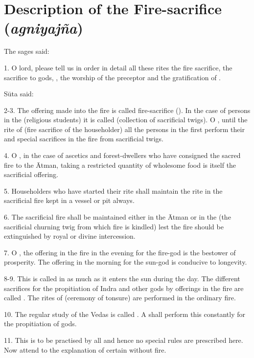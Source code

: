\chapter{Description of the Fire-sacrifice (\emph{agniyajña})}

The sages said:

1. O lord, please tell us in order in detail all these rites \viz the fire
sacrifice, the sacrifice to gods, , the worship of the preceptor
and the gratification of .

Sūta said:

2-3. The offering made into the fire is called fire-sacrifice ().
In the case of persons in the  (\ie religious students)
it is called  (collection of sacrificial twigs). O ,
until the rite of  (fire sacrifice of the householder) all
the persons in the first  perform their  and special
sacrifices in the fire from sacrificial twigs.

4. O , in the case of ascetics and forest-dwellers who have
consigned the sacred fire to the Ātman, taking a restricted quantity of
wholesome food is itself the sacrificial offering.

5. Householders who have started their  rite shall maintain
the rite in the sacrificial fire kept in a vessel or pit always.

6. The sacrificial fire shall be maintained either in the Ātman or in
the  (the sacrificial churning twig from which fire is kindled) lest
the fire should be extinguished by royal or divine intercession.

7. O , the offering in the fire in the evening for the fire-god is
the bestower of prosperity. The offering in the morning for the sun-god is
conducive to longevity.

8-9. This is called  in as much as it enters the sun during
the day. The different sacrifices  \etc for the propitiation of
Indra and other gods by offerings in the fire are called .
The rites of  (ceremony of tonsure) \etc are performed in the ordinary
fire.

10. The regular study of the Vedas is called . A 
shall perform this constantly for the propitiation of gods.

11. This is to be practised by all and hence no special rules are prescribed
here. Now attend to the explanation of certain  without fire.


